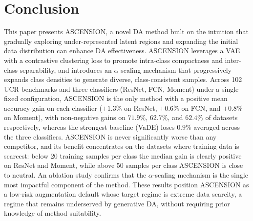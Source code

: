 \section{Conclusion}
\label{sec:conclusion}

This paper presents ASCENSION, a novel DA method built on the
intuition that gradually exploring under-represented latent
regions and expanding the initial data distribution can enhance
DA effectiveness. ASCENSION leverages a VAE with a contrastive
clustering loss to promote intra-class compactness and
inter-class separability, and introduces an $\alpha$-scaling
mechanism that progressively expands class densities to generate
diverse, class-consistent samples.
Across 102 UCR benchmarks and three classifiers (ResNet, FCN,
Moment) under a single fixed configuration, ASCENSION is the only
method with a positive mean accuracy gain on each classifier
($+1.3\%$ on ResNet, $+0.6\%$ on FCN, and $+0.8\%$ on Moment),
with non-negative gains on $71.9\%$, $62.7\%$, and $62.4\%$ of
datasets respectively, whereas the strongest baseline (VaDE) loses
$0.9\%$ averaged across the three
classifiers. ASCENSION is never significantly worse than
any competitor, and its benefit concentrates on the datasets where
training data is scarcest: below 20 training samples per class the
median gain is clearly positive on ResNet and Moment, while above
50 samples per class ASCENSION is close to neutral. An ablation study confirms that the $\alpha$-scaling
mechanism is the single most impactful component of the method.
These results position ASCENSION as a low-risk augmentation default
whose target regime is extreme data scarcity, a regime
that remains underserved by generative DA, without requiring prior
knowledge of method suitability.
